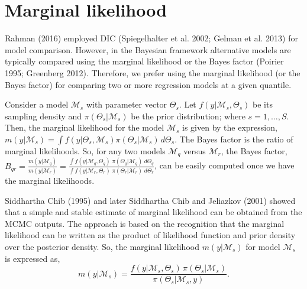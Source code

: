 \hypertarget{sec:ML}{%
\section{Marginal likelihood}\label{sec:ML}}

Rahman (2016) employed DIC (Spiegelhalter et al. 2002; Gelman et al. 2013) for model comparison. However, in the Bayesian framework alternative models are typically compared using the marginal likelihood or the Bayes factor (Poirier 1995; Greenberg 2012). Therefore, we prefer using the marginal likelihood (or the Bayes factor) for comparing two or more regression models at a given quantile.

Consider a model \(\mathcal{M}_{s}\) with parameter vector \(\Theta_{s}\). Let \(f(y|\mathcal{M}_{s}, \Theta_{s})\) be its sampling density and \(\pi(\Theta_{s}|\mathcal{M}_{s})\) be the prior distribution; where \(s=1,\ldots,S\). Then, the marginal likelihood for the model \(\mathcal{M}_{s}\) is given by the expression, \(m(y|\mathcal{M}_{s}) = \int f(y|\Theta_{s},\mathcal{M}_{s}) \pi(\Theta_{s}|\mathcal{M}_{s}) \, d\Theta_{s}\). The Bayes factor is the ratio of marginal likelihoods. So, for any two models \(\mathcal{M}_{q}\) versus \(\mathcal{M}_{r}\), the Bayes factor, \(B_{qr} = \frac{m(y|\mathcal{M}_{q})}{m(y|\mathcal{M}_{r})} = \frac{ \int f(y| \mathcal{M}_{q}, \Theta_{q}) \; \pi(\Theta_{q}|\mathcal{M}_{q}) \; d\Theta_{q}} {\int f(y| \mathcal{M}_{r}, \Theta_{r}) \; \pi(\Theta_{r}|\mathcal{M}_{r}) \; d\Theta_{r}}\), can be easily computed once we have the marginal likelihoods.

Siddhartha Chib (1995) and later Siddhartha Chib and Jeliazkov (2001) showed that a simple and stable estimate of marginal likelihood can be obtained from the MCMC outputs. The approach is based on the recognition that the marginal likelihood can be written as the product of likelihood function and prior density over the posterior density. So, the marginal likelihood \(m(y|\mathcal{M}_{s})\) for model \(\mathcal{M}_{s}\) is expressed as,
\begin{equation}
m(y|\mathcal{M}_{s}) = \frac{f(y|\mathcal{M}_{s},\Theta_{s}) \, \pi(\Theta_{s}|\mathcal{M}_{s})}{\pi(\Theta_{s}|\mathcal{M}_{s},y)}.
\label{eq:BMLI} 
\end{equation}

